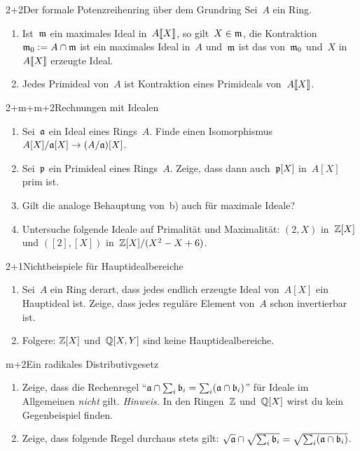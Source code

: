 \documentclass{uebblatt}
\begin{document}

\begin{aufgabe}{2+2}{Der formale Potenzreihenring über dem Grundring}
Sei~$A$ ein Ring.
\begin{enumerate}
\item Ist~$\mathfrak{m}$ ein maximales Ideal in~${A}\llbracket{X}\rrbracket$, so gilt~$X \in \mathfrak{m}$, die
Kontraktion~$\mathfrak{m}_0 \vcentcolon= A \cap \mathfrak{m}$ ist ein maximales Ideal in~$A$ und~$\mathfrak{m}$
ist das von~$\mathfrak{m}_0$ und~$X$ in~${A}\llbracket{X}\rrbracket$ erzeugte Ideal.
\item Jedes Primideal von~$A$ ist Kontraktion eines Primideals von~${A}\llbracket{X}\rrbracket$.
\end{enumerate}
\end{aufgabe}

\begin{aufgabe}{2+m+m+2}{Rechnungen mit Idealen}
\begin{enumerate}
\item Sei~$\mathfrak{a}$ ein Ideal eines Rings~$A$. Finde einen
Isomorphismus~$A[X]/\mathfrak{a}[X] \to (A/\mathfrak{a})[X]$.
\item Sei~$\mathfrak{p}$ ein Primideal eines Rings~$A$. Zeige, dass dann auch~$\mathfrak{p}[X]$
in~$A[X]$ prim ist.
\item Gilt die analoge Behauptung von~b) auch für maximale Ideale?
\item Untersuche folgende Ideale auf Primalität und Maximalität:
$(2, X)$ in~$\mathbb{Z}[X]$ und $([2], [X])$ in~$\mathbb{Z}[X]/(X^2 - X + 6)$.
\end{enumerate}
\end{aufgabe}

\begin{aufgabe}{2+1}{Nichtbeispiele für Hauptidealbereiche}
\begin{enumerate}
\item Sei~$A$ ein Ring derart, dass jedes endlich erzeugte Ideal von~$A[X]$ ein
Hauptideal ist. Zeige, dass jedes reguläre Element von~$A$ schon invertierbar
ist.
\item Folgere: $\mathbb{Z}[X]$ und~$\mathbb{Q}[X,Y]$ sind keine Hauptidealbereiche.
\end{enumerate}
\end{aufgabe}

\begin{aufgabe}{m+2}{Ein radikales Distributivgesetz}
\begin{enumerate}
\item Zeige, dass die Rechenregel
"`$\mathfrak{a} \cap \sum_i \mathfrak{b}_i = \sum_i (\mathfrak{a} \cap \mathfrak{b}_i)$"'
für Ideale im Allgemeinen \emph{nicht} gilt. \emph{Hinweis.} In den
Ringen~$\mathbb{Z}$ und~$\mathbb{Q}[X]$ wirst du kein Gegenbeispiel finden.
\item Zeige, dass folgende Regel durchaus stets gilt:
$\sqrt{\mathfrak{a}} \cap \sqrt{\sum_i \mathfrak{b}_i} = \sqrt{\sum_i (\mathfrak{a} \cap \mathfrak{b}_i)}$.
\end{enumerate}
\end{aufgabe}
\end{document}
